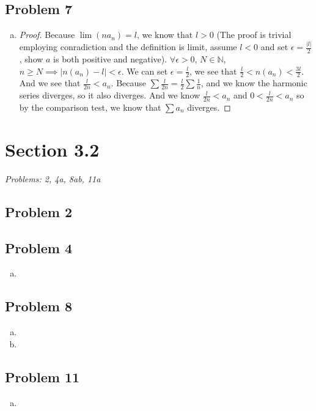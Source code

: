 \documentclass[12pt]{article}
\begin{document}
\subsection*{Problem 7}
\begin{enumerate}[a).]
    \item {
        \begin{proof}
            Because $\lim (n a_n) = l$, we know that $l > 0$ (The proof is trivial employing conradiction and the definition is limit, assume $l < 0$ and set $\epsilon = \frac{|l|}{2}$, show $a$ is both positive and negative).
            $\forall \epsilon > 0$, $N \in \mathbb{N}$, $ n \ge N \implies |n(a_n) - l | < \epsilon$. 
            We can set $\epsilon = \frac{l}{2}$, we see that $\frac{l}{2} < n(a_n) < \frac{3l}{2}$. 
            And we see that $\frac{l}{2n} < a_n$. 
            Because $\sum \frac{l}{2n} = \frac{l}{2}\sum\frac{1}{n}$, and we know the harmonic series diverges, so it also diverges. 
            And we know $\frac{l}{2n} < a_n$ and $0 < \frac{l}{2n} < a_n$ so by the comparison test, we know that $\sum a_n$ diverges.
        \end{proof}
    }
\end{enumerate}


\vspace*{1cm}


\section*{Section 3.2}
\textit{Problems: 2, 4a, 8ab, 11a}
\subsection*{Problem 2}


\subsection*{Problem 4}
\begin{enumerate}[a).]
    \item {

    }
\end{enumerate}

\subsection*{Problem 8}
\begin{enumerate}[a).]
    \item {

    }
    \item {

    }
\end{enumerate}

\subsection*{Problem 11}
\begin{enumerate}[a).]
    \item {

    }
\end{enumerate}
\end{document}
